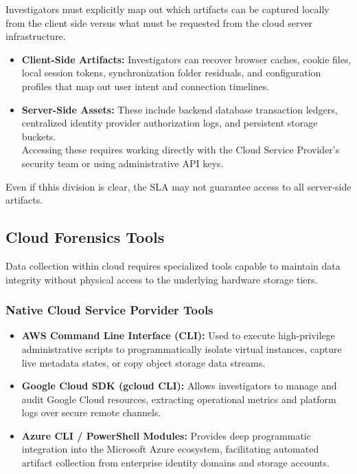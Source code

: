 \noindent
Investigators must explicitly map out which artifacts can be captured locally from the client side versus what must be requested from the cloud server infrastructure.

\begin{itemize}
    \item \textbf{Client-Side Artifacts:} Investigators can recover browser caches, cookie files, local session tokens, synchronization folder residuals, and configuration profiles that map out user intent and connection timelines.
    \item \textbf{Server-Side Assets:} These include backend database transaction ledgers, centralized identity provider authorization logs, and persistent storage buckets.\\ Accessing these requires working directly with the Cloud Service Provider's security team or using administrative API keys.
\end{itemize}
\noindent
Even if thhis division is clear, the SLA may not guarantee access to all server-side artifacts.


\subsection{Cloud Forensics Tools}

Data collection within cloud requires specialized tools capable to maintain data integrity without physical access to the underlying hardware storage tiers.

\subsubsection{Native Cloud Service Porvider Tools}

\begin{itemize}
    \item \textbf{AWS Command Line Interface (CLI):} Used to execute high-privilege administrative scripts to programmatically isolate virtual instances, capture live metadata states, or copy object storage data streams.
    \item \textbf{Google Cloud SDK (gcloud CLI):} Allows investigators to manage and audit Google Cloud resources, extracting operational metrics and platform logs over secure remote channels.
    \item \textbf{Azure CLI / PowerShell Modules:} Provides deep programmatic integration into the Microsoft Azure ecosystem, facilitating automated artifact collection from enterprise identity domains and storage accounts.
\end{itemize}

